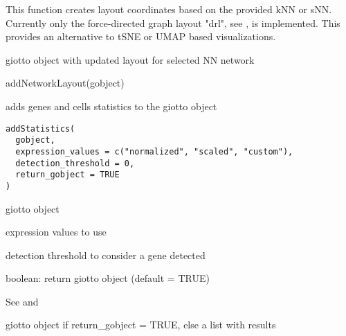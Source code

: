 \documentclass[a4paper]{book}
\begin{document}
%
\begin{Details}\relax
This function creates layout coordinates based on the provided kNN or sNN.
Currently only the force-directed graph layout "drl", see ,
is implemented. This provides an alternative to tSNE or UMAP based visualizations.
\end{Details}
%
\begin{Value}
giotto object with updated layout for selected NN network
\end{Value}
%
\begin{Examples}
\begin{ExampleCode}
    addNetworkLayout(gobject)
\end{ExampleCode}
\end{Examples}
%
\begin{Description}\relax
adds genes and cells statistics to the giotto object
\end{Description}
%
\begin{Usage}
\begin{verbatim}
addStatistics(
  gobject,
  expression_values = c("normalized", "scaled", "custom"),
  detection_threshold = 0,
  return_gobject = TRUE
)
\end{verbatim}
\end{Usage}
%
\begin{Arguments}
\begin{ldescription}
\item[\code{gobject}] giotto object

\item[\code{expression\_values}] expression values to use

\item[\code{detection\_threshold}] detection threshold to consider a gene detected

\item[\code{return\_gobject}] boolean: return giotto object (default = TRUE)
\end{ldescription}
\end{Arguments}
%
\begin{Details}\relax
See  and 
\end{Details}
%
\begin{Value}
giotto object if return\_gobject = TRUE, else a list with results
\end{Value}
\end{document}
